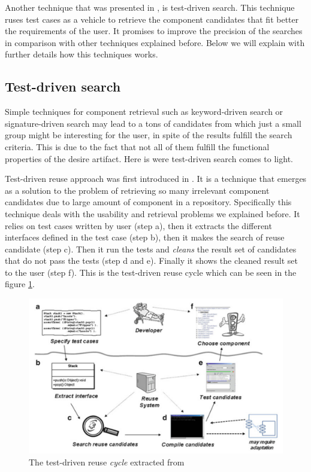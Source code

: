 Another technique that was presented in \cite{Hummel2004}, is test-driven search. This technique ruses test cases as a vehicle to retrieve the component candidates that fit better the requirements of the user. It promises to improve the precision of the searches in comparison with other techniques explained before. Below we will explain with further details how this techniques works. 

\subsection{Test-driven search}
Simple techniques for component retrieval such as keyword-driven search or signature-driven search may lead to a tons of candidates from which just a small group might be interesting for the user, in spite of the results fulfill the search criteria. This is due to the fact that not all of them fulfill the functional properties of the desire artifact. Here is were test-driven search comes to light. 

Test-driven reuse approach was first introduced in \cite{Hummel2004}. It is a technique that emerges as a solution to the problem of retrieving so many irrelevant component candidates due to large amount of component in a repository. Specifically this technique deals with the usability and retrieval problems we explained before. It relies on test cases written by user (step a), then it extracts the different interfaces defined in the test case (step b), then it makes the search of reuse candidate (step c). Then it run the tests and \textit{cleans} the result set of candidates that do not pass the tests (step d and e). Finally it shows the cleaned result set to the user (step f). This is the test-driven reuse cycle which can be seen in the figure \ref{fig:test-driven-cycle}.

\begin{figure}[ht]
	\centering
    \includegraphics[width=\textwidth]{grafiken/test-driven-cycle}
    \caption{The test-driven reuse \textit{cycle} extracted from \citep{Hummel2013}}
    \label{fig:test-driven-cycle}
\end{figure}

